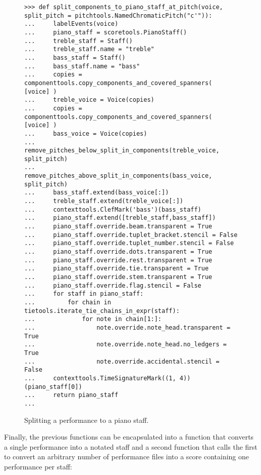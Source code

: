 \begin{figure}[H]
\begin{lstlisting}[basicstyle=\scriptsize\ttfamily, breaklines=True, tabsize=4, showtabs=false, showspaces=false]
>>> def split_components_to_piano_staff_at_pitch(voice, split_pitch = pitchtools.NamedChromaticPitch("c'")):
...     labelEvents(voice)
...     piano_staff = scoretools.PianoStaff()
...     treble_staff = Staff()
...     treble_staff.name = "treble"
...     bass_staff = Staff()
...     bass_staff.name = "bass"
...     copies = componenttools.copy_components_and_covered_spanners( [voice] )
...     treble_voice = Voice(copies)
...     copies = componenttools.copy_components_and_covered_spanners( [voice] )
...     bass_voice = Voice(copies)
...     remove_pitches_below_split_in_components(treble_voice, split_pitch)
...     remove_pitches_above_split_in_components(bass_voice, split_pitch)
...     bass_staff.extend(bass_voice[:])
...     treble_staff.extend(treble_voice[:])
...     contexttools.ClefMark('bass')(bass_staff)
...     piano_staff.extend([treble_staff,bass_staff])
...     piano_staff.override.beam.transparent = True
...     piano_staff.override.tuplet_bracket.stencil = False
...     piano_staff.override.tuplet_number.stencil = False
...     piano_staff.override.dots.transparent = True
...     piano_staff.override.rest.transparent = True
...     piano_staff.override.tie.transparent = True
...     piano_staff.override.stem.transparent = True
...     piano_staff.override.flag.stencil = False
...     for staff in piano_staff:
...         for chain in tietools.iterate_tie_chains_in_expr(staff):
...             for note in chain[1:]:
...                 note.override.note_head.transparent = True
...                 note.override.note_head.no_ledgers = True
...                 note.override.accidental.stencil = False
...     contexttools.TimeSignatureMark((1, 4))(piano_staff[0])
...     return piano_staff
... \end{lstlisting}

\caption{Splitting a performance to a piano staff. } 
\end{figure}

Finally, the previous functions can be encapsulated into a function that converts a single performance into a notated staff and a second function that calls the first to convert an arbitrary number of performance files into a score containing one performance per staff:

